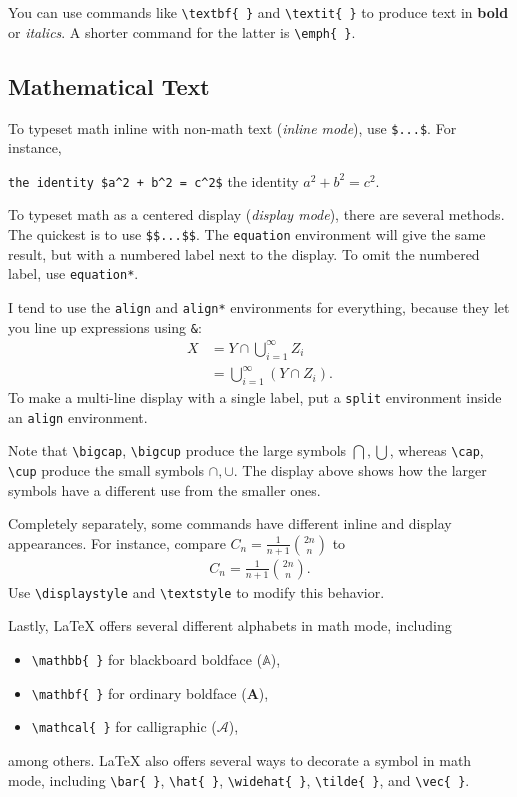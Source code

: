 \documentclass[a4paper,10pt,leqno]{article}
\numberwithin{equation}{section}
\theoremstyle{plain}
\theoremstyle{definition}
\theoremstyle{remark}
\begin{document}
You can use commands like \texttt{\textbackslash{}textbf\{ \}} and  \texttt{\textbackslash{}textit\{ \}} to produce text in \textbf{bold} or \textit{italics}.
A shorter command for the latter is \texttt{\textbackslash{}emph\{ \}}.

\subsection{Mathematical Text}

To typeset math inline with non-math text (\emph{inline mode}), use \verb|$...$|.
For instance,
\begin{center}
\verb|the identity $a^2 + b^2 = c^2$|
\quad
the identity $a^2 + b^2 = c^2$.
\end{center}
To typeset math as a centered display (\emph{display mode}), there are several methods.
The quickest is to use \verb|$$...$$|.
The \texttt{equation} environment will give the same result, but with a numbered label next to the display.
To omit the numbered label, use \texttt{equation*}.

I tend to use the \texttt{align} and \texttt{align*} environments for everything, because they let you line up expressions using \verb|&|:
\begin{align}\label{eq:1}
X 
	&= Y \cap \bigcup_{i = 1}^\infty Z_i\\
	&= \bigcup_{i = 1}^\infty {(Y \cap Z_i)}.
\end{align}
To make a multi-line display with a single label, put a \texttt{split} environment inside an \texttt{align} environment.

Note that \verb|\bigcap|, \verb|\bigcup| produce the large symbols $\bigcap, \bigcup$, whereas \verb|\cap|, \verb|\cup| produce the small symbols $\cap, \cup$.
The display above shows how the larger symbols have a different use from the smaller ones.

Completely separately, some commands have different inline and display appearances.
For instance, compare $C_n = \frac{1}{n + 1} \binom{2n}{n}$ to
\begin{align*}
C_n = \frac{1}{n + 1} \binom{2n}{n}.
\end{align*}
Use \verb|\displaystyle| and \verb|\textstyle| to modify this behavior.

Lastly, \LaTeX{} offers several different alphabets in math mode, including
\begin{itemize} 
\item 	\verb|\mathbb{ }| for blackboard boldface ($\mathbb{A}$),

\item 	\verb|\mathbf{ }| for ordinary boldface ($\mathbf{A}$), 

\item 	\verb|\mathcal{ }| for calligraphic ($\mathcal{A}$),

\end{itemize}
among others.
\LaTeX{} also offers several ways to decorate a symbol in math mode, including \verb|\bar{ }|, \verb|\hat{ }|, \verb|\widehat{ }|, \verb|\tilde{ }|, and \verb|\vec{ }|.
\end{document}
